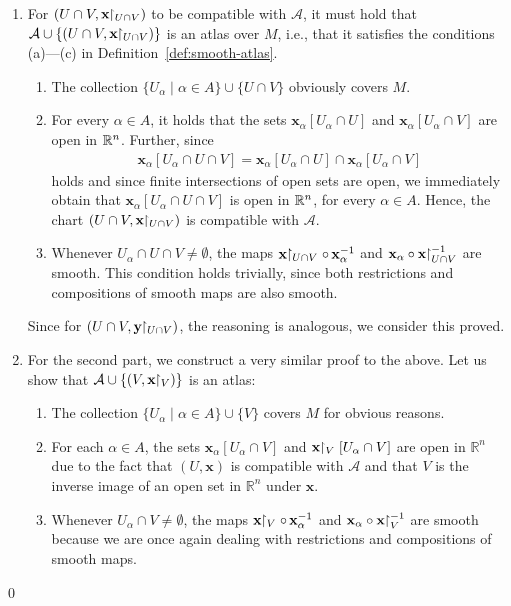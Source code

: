 \documentclass[11pt,a4paper,twoside,openany]{report}
\theoremstyle{my-theorem}
\theoremstyle{non-theorem}
\renewenvironment{proof}[1][\proofname]{{\scshape #1. }}{\qed}
\begin{document}
		\begin{proof}
			\begin{enumerate}[label=\rm(\roman*)]
				\item For $(U \cap V, \mathbf x \!\!\upharpoonright_{U \cap V})$ to be compatible with $\mathcal A$, it must hold that $\mathcal A \cup \{(U \cap V, \mathbf x \!\!\upharpoonright_{U \cap V})\}$ is an atlas over $M$, i.e., that it satisfies the conditions (a)---(c) in Definition~\ref{def:smooth-atlas}.
				\begin{enumerate}[label=\rm(\alph*)]
					\item The collection $\{U_\alpha \mid \alpha \in A\} \cup \{U \cap V\}$ obviously covers $M$.
					\item For every $\alpha \in A$, it holds that the sets $\mathbf x_\alpha[U_\alpha \cap U]$ and $\mathbf x_\alpha[U_\alpha \cap V]$ are open in ${\mathbb R}^n$. Further, since
					\begin{align*}
						\mathbf x_\alpha[U_\alpha \cap U \cap V] = \mathbf x_\alpha[U_\alpha \cap U] \cap \mathbf x_\alpha[U_\alpha \cap V]
					\end{align*}
					holds and since finite intersections of open sets are open, we immediately obtain that $\mathbf x_\alpha[U_\alpha \cap U \cap V]$ is open in ${\mathbb R}^n$, for every $\alpha \in A$. Hence, the chart $(U \cap V, \mathbf x\!\!\upharpoonright_{U \cap V})$ is compatible with $\mathcal A$.
					
					\item Whenever $U_\alpha \cap U \cap V \neq \emptyset$, the maps $\mathbf x \!\!\upharpoonright_{U \cap V} \circ \, \mathbf x_\alpha^{-1}$ and $\mathbf x_\alpha \circ \mathbf x \!\!\upharpoonright_{U \cap V}^{-1}$ are smooth. This condition holds trivially, since both restrictions and compositions of smooth maps are also smooth.
				\end{enumerate}
				Since for $(U \cap V, \mathbf y \!\!\upharpoonright_{U \cap V})$, the reasoning is analogous, we consider this proved.
				
				\item For the second part, we construct a very similar proof to the above. Let us show that $\mathcal A \cup \{(V, \mathbf x \!\!\upharpoonright_V)\}$ is an atlas:
				\begin{enumerate}[label=\rm(\alph*)]
					\item The collection $\{U_\alpha \mid \alpha \in A\} \cup \{V\}$ covers $M$ for obvious reasons.
					\item For each $\alpha \in A$, the sets $\mathbf x_\alpha[U_\alpha \cap V]$ and $\mathbf x \!\!\upharpoonright_V[U_\alpha \cap V]$ are open in $\mathbb R^n$ due to the fact that $(U, \mathbf x)$ is compatible with $\mathcal A$ and that $V$ is the inverse image of an open set in $\mathbb R^n$ under $\mathbf x$.
					\item Whenever $U_\alpha \cap V \neq \emptyset$, the maps $\mathbf x\!\!\upharpoonright_V \circ \, \mathbf x_\alpha^{-1}$ and $\mathbf x_\alpha \circ \mathbf x\!\!\upharpoonright_V^{-1}$ are smooth because we are once again dealing with restrictions and compositions of smooth maps.
				\end{enumerate}
			\end{enumerate}
		\end{proof}
	
\end{document}
